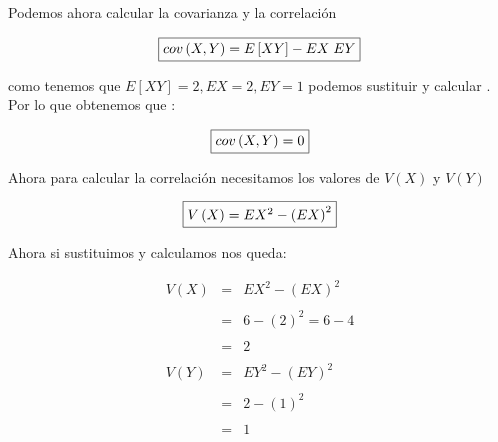 \documentclass[12pt]{article}
\begin{document}
    \vspace{1cm} 

    \begin{flushleft}
        Podemos ahora calcular la covarianza y la correlaci\'on 
    \end{flushleft}

    \begin{equation*}
        \fbox{$
            cov \left(X,Y\right) = E\left[XY\right] - EX \hspace{1mm}EY
        $}
    \end{equation*}

    \begin{flushleft}
        como tenemos que $E\left[XY\right] = 2 , EX =2  , EY=1 $ podemos sustituir y calcular . Por lo que obtenemos que : 
    \end{flushleft}

    \begin{equation*}
        \fbox{$
            cov \left(X,Y\right) = 0 
        $}
    \end{equation*}

    \begin{flushleft}
        Ahora para calcular la correlaci\'on necesitamos los valores de $V\left(X\right)$ y $V\left(Y\right)$
    \end{flushleft}

    \begin{equation*}
        \fbox{$
            V\left(X\right)  =  EX^2 - \left(EX\right)^2
        $}
    \end{equation*}

    \begin{flushleft}
        Ahora si sustituimos y calculamos nos queda: 
    \end{flushleft}
    \begin{equation*}
        \begin{array}{rcl}
            V\left(X\right) & = & EX^2 - \left(EX\right)^2
            \\ 
            \\
                            & = & 6 - \left(2\right)^2 = 6-4 
            \\
            \\
                            & = & 2
            \\
            \\
            V\left(Y\right) & = & EY^2  - \left(EY\right)^2
            \\
            \\
                            & = & 2 - \left(1\right)^2
            \\
            \\
                            & = & 1
        \end{array}
    \end{equation*}
    
\end{document}
